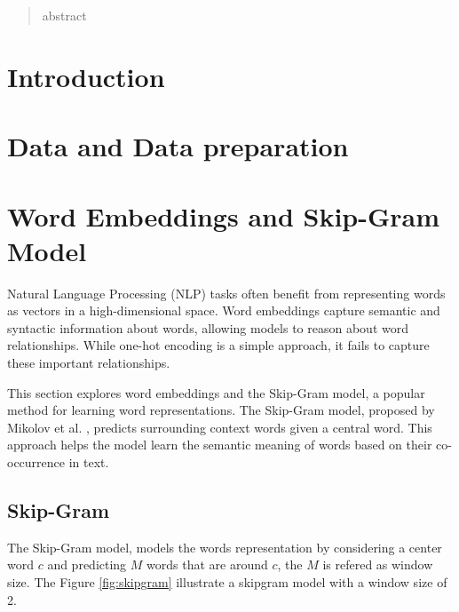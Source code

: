 \begin{abstract}
	abstract
\end{abstract}

\section{Introduction}
\section{Data and Data preparation}
\section{Word Embeddings and Skip-Gram Model}
Natural Language Processing (NLP) tasks often benefit from representing words as vectors in a high-dimensional space.
 Word embeddings capture semantic and syntactic information about words, allowing models to reason about word relationships. While one-hot encoding is a simple approach, it fails to capture these important relationships.

 This section explores word embeddings and the Skip-Gram model,
 a popular method for learning word representations. The Skip-Gram model, proposed by Mikolov et al. \cite{word2vec}, predicts surrounding context words given a central word. This approach helps the model learn the semantic meaning of words based on their co-occurrence in text.
\subsection{Skip-Gram}
The Skip-Gram model, models the words representation by considering a center word $c$ and predicting $M$ words that are around $c$, the $M$ is refered as window size. The Figure \ref{fig:skipgram} illustrate a skipgram model with a window size of 2.

